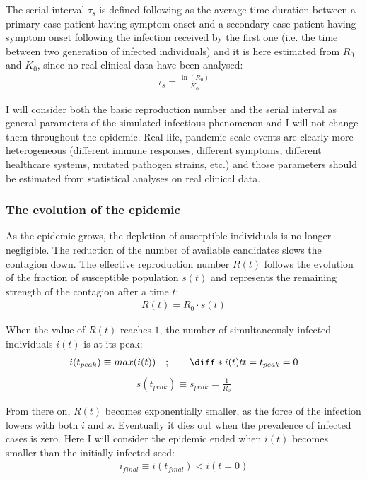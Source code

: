 \documentclass[DIV=12, BCOR=0pt]{scrartcl}  %
\begin{document}
	The serial interval $\tau_s$ is defined following \citet{Du2020} as the average time duration between a primary case-patient having symptom onset and a secondary case-patient having symptom onset following the infection received by the first one (i.e. the time between two generation of infected individuals) and it is here estimated from $R_0$ and $K_0$, since no real clinical data have been analysed: 
	\begin{align}
		\tau_s = \frac{\ln(R_0)}{K_0}
		\label{eq:serial}
	\end{align}

	I will consider both the basic reproduction number and the serial interval as general parameters of the simulated infectious phenomenon and I will not change them throughout the epidemic. Real-life, pandemic-scale events are clearly more heterogeneous (different immune responses, different symptoms, different healthcare systems, mutated pathogen strains, etc.) and those parameters should be estimated from statistical analyses on real clinical data.  

  \subsubsection{The evolution of the epidemic}
  As the epidemic grows, the depletion of susceptible individuals is no longer negligible. The reduction of the number of available candidates slows the contagion down.
  The effective reproduction number $R(t)$ follows the evolution of the fraction of susceptible population $s(t)$ and represents the remaining strength of the contagion after a time $t$:
  \begin{align}
		R(t) = R_0 \cdot s(t) 
		\label{eq:Rt}
  \end{align}

  When the value of $R(t)$ reaches $1$, the number of simultaneously infected individuals $i(t)$ is at its peak:
  \begin{align}
  	i(t_{peak}) \equiv max(i(t)) \quad ; \qquad \diff*{i(t)}{t}{t = t_{peak}} = 0
  	\label{eq:peak}
  \end{align}
	\begin{align}
		s(t_{peak}) \equiv s_{peak} = \frac{1}{R_0}
	\end{align}

From there on, $R(t)$  becomes exponentially smaller, as the force of the infection lowers with both $i$ and $s$. Eventually it dies out when the prevalence of infected cases is zero. Here I will consider the epidemic ended when $i(t)$ becomes smaller than the initially infected seed:
\begin{align}
	i_{final} \equiv i(t_{final}) < i(t \! = \! 0)
\end{align}
\end{document}
